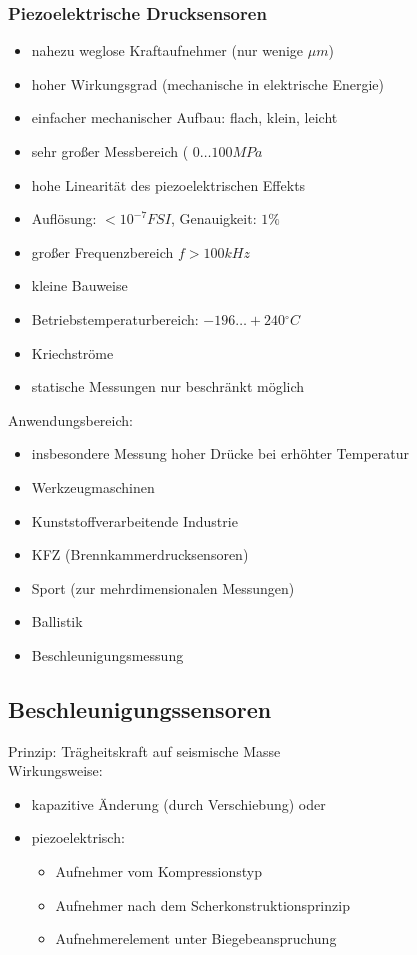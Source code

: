 \subsubsection*{Piezoelektrische Drucksensoren}
\begin{itemize}[label=$+$]
\item nahezu weglose Kraftaufnehmer (nur wenige $\unit{\mu m}$)
\item hoher Wirkungsgrad (mechanische in elektrische Energie)
\item einfacher mechanischer Aufbau: flach, klein, leicht
\item sehr großer Messbereich ( $0 \ldots 100 \unit{MPa}$
\item hohe Linearität des piezoelektrischen Effekts
\item Auflösung: $< 10^{-7} \unit{FSI}$, Genauigkeit: $1\%$
\item großer Frequenzbereich $f > 100 \unit{kHz}$
\item kleine Bauweise
\item Betriebstemperaturbereich: $-196 \ldots + 240 \unit{^\circ C}$
\end{itemize}
\begin{itemize}[label=$-$]
\item Kriechströme
\item statische Messungen nur beschränkt möglich
\end{itemize}
Anwendungsbereich:
\begin{itemize}
\item insbesondere Messung hoher Drücke bei erhöhter Temperatur
\item Werkzeugmaschinen
\item Kunststoffverarbeitende Industrie
\item KFZ (Brennkammerdrucksensoren)
\item Sport (zur mehrdimensionalen Messungen)
\item Ballistik
\item Beschleunigungsmessung
\end{itemize}

\subsection{Beschleunigungssensoren}
Prinzip: Trägheitskraft auf seismische Masse\\
Wirkungsweise:
\begin{itemize}
\item kapazitive Änderung (durch Verschiebung) oder
\item piezoelektrisch:
\begin{itemize}
\item Aufnehmer vom Kompressionstyp
\item Aufnehmer nach dem Scherkonstruktionsprinzip
\item Aufnehmerelement unter Biegebeanspruchung
\end{itemize}
\end{itemize}
